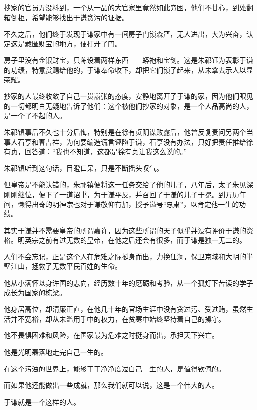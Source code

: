 \begin{multicols}{\theparacolNo}
抄家的官员万没料到，一个从一品的大官家里竟然如此穷困，他们不甘心，到处翻箱倒柜，希望能够找出于谦贪污的证据。

不久之后，他们终于发现于谦家中有一间房子门锁森严，无人进出，大为兴奋，认定这是藏匿财宝的地方，便打开了门。

房子里没有金银财宝，只陈设着两样东西——蟒袍和宝剑。这是朱祁钰为表彰于谦的功绩，特意赏赐给他的，于谦奉命收下，却把它们锁了起来，从未拿去示人以显荣耀。

抄家的人最终收敛了自己一贯嚣张的态度，安静地离开了于谦的家，因为他们眼见的一切都明白无疑地告诉了他们：这个被他们抄家的对象，是一个人品高尚的人，是一个了不起的人。

朱祁镇事后不久也十分后悔，特别是在徐有贞阴谋败露后，他曾反复责问另两个当事人石亨和曹吉祥，为何要编造谎言诬陷于谦，石亨没有办法，只好把责任推给徐有贞，回答道：“我也不知道，这都是徐有贞让我这么说的。”

朱祁镇听到这句话，目瞪口呆，只是不断摇头叹气。

但皇帝是不能认错的，朱祁镇便将这一任务交给了他的儿子，八年后，太子朱见深刚刚继位，便下了一道诏书，为于谦平反，并召回了于谦的儿子于冕。到万历年间，懒得出奇的明神宗也对于谦敬仰有加，授予谥号“忠肃”，以肯定他一生的功绩。

其实于谦并不需要皇帝的所谓嘉许，因为这些所谓的天子似乎并没有评价于谦的资格。明英宗之前有过无数的皇帝，在他之后还会有很多，而于谦是独一无二的。

人们不会忘记，正是这个人在危难之际挺身而出，力挽狂澜，保卫京城和大明的半壁江山，拯救了无数平民百姓的生命。

他从小满怀以身许国的志向，经历数十年的磨砺和考验，从一个孤灯下苦读的学子成长为国家的栋梁。

他身居高位，却清廉正直，在他几十年的官场生涯中没有贪过污、受过贿，虽然生活并不宽裕，却从未滥用手中的权力，在贫寒中始终坚持着自己的操守。

他不畏惧困难和风险，在国家最为危难之时挺身而出，承担天下兴亡。

他是光明磊落地走完自己一生的。

在这个污浊的世界上，能够干干净净度过自己一生的人，是值得钦佩的。

而如果他还能做出一些成就，那么我们就可以说，这是一个伟大的人。

于谦就是一个这样的人。


\end{multicols}
